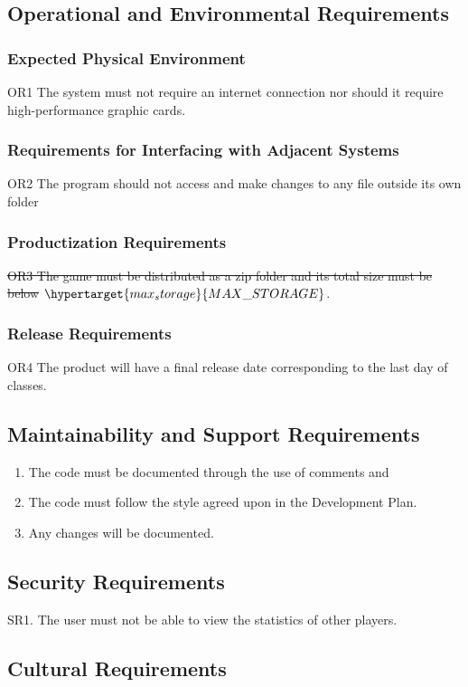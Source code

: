 \documentclass[12pt, titlepage]{article}
\begin{document}
	\subsection{Operational and Environmental Requirements}
	\subsubsection{Expected Physical Environment}
	OR1 The system must not require an internet connection nor should it 
	require 
	high-performance graphic cards.
	\subsubsection{Requirements for Interfacing with Adjacent Systems}
	OR2 The program should not access and make changes to any file outside its 
	own 
	folder
	\subsubsection{Productization Requirements}
	\st{OR3 The game must be distributed as a zip folder and its total size must be 
	below} $\hypertarget{max_storage}{MAX\_STORAGE}$.	\subsubsection{Release Requirements}
	OR4 The product will have a final release date corresponding to the last 
	day 
	of 
	classes.
	\subsection{Maintainability and Support Requirements}
	\begin{enumerate}[label=M\arabic*]
		\item The code must be documented through the use of comments and 
		\item The code must follow the style agreed upon in the Development 
		Plan.
		\item Any changes will be documented.  
	\end{enumerate}
	
	\subsection{Security Requirements}
	
	SR1. The user must not be able to view the statistics of other players.
	
	\subsection{Cultural Requirements}
\end{document}
